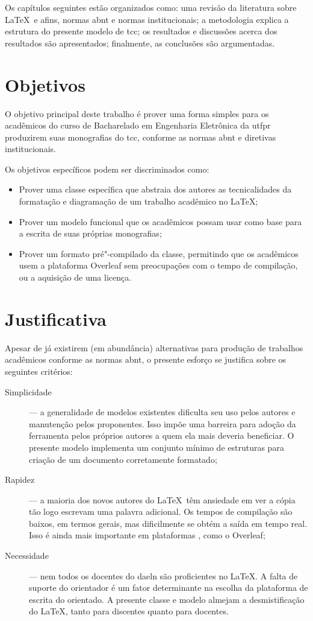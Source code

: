 Os capítulos seguintes estão organizados como: uma revisão da literatura sobre \LaTeX\ e afins, normas \ac{abnt} e normas institucionais; a metodologia explica a estrutura do presente modelo de \ac{tcc}; os resultados e discussões acerca dos resultados são apresentados; finalmente, as conclusões são argumentadas.

\section{Objetivos}

O objetivo principal deste trabalho é prover uma forma simples para os acadêmicos do curso de Bacharelado em Engenharia Eletrônica da \ac{utfpr} produzirem suas monografias do \ac{tcc}, conforme as normas \ac{abnt} e diretivas institucionais.

Os objetivos específicos podem ser discriminados como:
\begin{itemize}
	\item Prover uma classe específica que abstraia dos autores as tecnicalidades da formatação e diagramação de um trabalho acadêmico no \LaTeX;
	\item Prover um modelo funcional que os acadêmicos possam usar como base para a escrita de suas próprias monografias;
	\item Prover um formato pré"-compilado da classe, permitindo que os acadêmicos usem a plataforma Overleaf sem preocupações com o tempo de compilação, ou a aquisição de uma licença.
\end{itemize}

\section{Justificativa}

Apesar de já existirem (em abundância) alternativas para produção de trabalhos acadêmicos conforme as normas \ac{abnt}, o presente esforço se justifica sobre os seguintes critérios:
\begin{description}
	\item[Simplicidade] --- a generalidade de modelos existentes dificulta seu uso pelos autores e manutenção pelos proponentes. Isso impõe uma barreira para adoção da ferramenta pelos próprios autores a quem ela mais deveria beneficiar. O presente modelo implementa um conjunto mínimo de estruturas para criação de um documento corretamente formatado;
	\item[Rapidez] --- a maioria dos novos autores do \LaTeX\ têm ansiedade em ver a cópia tão logo escrevam uma palavra adicional. Os tempos de compilação são baixos, em termos gerais, mas dificilmente se obtém a saída em tempo real. Isso é ainda mais importante em plataformas , como o Overleaf;
	\item[Necessidade] --- nem todos os docentes do \ac{daeln} são proficientes no \LaTeX. A falta de suporte do orientador é um fator determinante na escolha da plataforma de escrita do orientado. A presente classe e modelo almejam a desmistificação do \LaTeX, tanto para discentes quanto para docentes.
\end{description}

